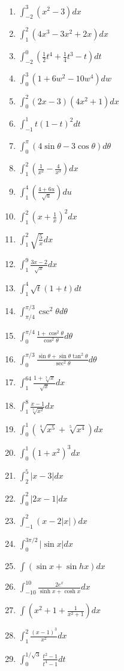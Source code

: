 \documentclass[12pt,]{article}
\begin{document}
\begin{enumerate}
\def\labelenumi{\arabic{enumi}.}
\setcounter{enumi}{16}
\item
  \(\displaystyle\int_{-2}^{3}(x^2-3)dx\)
\item
  \(\displaystyle\int_{1}^{2}(4x^3-3x^2+2x)dx\)
\item
  \(\displaystyle\int_{-2}^{0}(\frac{1}{2}t^4+\frac{1}{4}t^3-t)dt\)
\item
  \(\displaystyle\int_{0}^{3}(1+6w^2-10w^4)dw\)
\item
  \(\displaystyle\int_{0}^{2}(2x-3)(4x^2+1)dx\)
\item
  \(\displaystyle\int_{-1}^{1}t(1-t)^2dt\)
\item
  \(\displaystyle\int_{0}^{\pi}(4\sin\theta-3\cos\theta)d\theta\)
\item
  \(\displaystyle\int_{1}^{2}\left(\frac{1}{x^2}-\frac{4}{x^3}\right)dx\)
\item
  \(\displaystyle\int_{1}^{4}\left(\frac{4+6u}{\sqrt{u}}\right)du\)
\item
  \(\displaystyle\int_{1}^{2}\left(x+\frac{1}{x}\right)^2dx\)
\item
  \(\displaystyle\int_{1}^{2}\sqrt{\frac{5}{x}}dx\)
\item
  \(\displaystyle\int_{1}^{9}\frac{3x-2}{\sqrt{x}}dx\)
\item
  \(\displaystyle\int_{1}^{4}\sqrt{t}(1+t)dt\)
\item
  \(\displaystyle\int_{\pi/4}^{\pi/3}\csc^2\theta d\theta\)
\item
  \(\displaystyle\int_{0}^{\pi/4}\frac{1+\cos^2\theta}{\cos^2\theta}d\theta\)
\item
  \(\displaystyle\int_{0}^{\pi/3}\frac{\sin\theta+\sin\theta\tan^2\theta}{\sec^2\theta}d\theta\)
\item
  \(\displaystyle\int_{1}^{64}\frac{1+\sqrt[3]{x}}{\sqrt{x}}dx\)
\item
  \(\displaystyle\int_{1}^{8}\frac{x-1}{\sqrt[3]{x^2}}dx\)
\item
  \(\displaystyle\int_{0}^{1}(\sqrt[4]{x^5}+\sqrt[5]{x^4})dx\)
\item
  \(\displaystyle\int_{0}^{1}(1+x^2)^3dx\)
\item
  \(\displaystyle\int_{2}^{5}|x-3|dx\)
\item
  \(\displaystyle\int_{0}^{2}|2x-1|dx\)
\item
  \(\displaystyle\int_{-1}^{2}(x-2|x|)dx\)
\item
  \(\displaystyle\int_{0}^{3\pi/2}|\sin x|dx\)
\item
  \(\displaystyle\int(\sin x + \sin h x )dx\)
\item
  \(\displaystyle\int_{-10}^{10}\frac{2e^{x}}{\sinh x + \cosh x}dx\)
\item
  \(\displaystyle\int\left(x^2+1+\frac{1}{x^2+1}\right)dx\)
\item
  \(\displaystyle\int_{1}^{2}\frac{(x-1)^3}{x^2}dx\)
\item
  \(\displaystyle\int_{0}^{1/\sqrt{3}}\frac{t^2-1}{t^4-1}dt\)
\end{enumerate}
\end{document}
